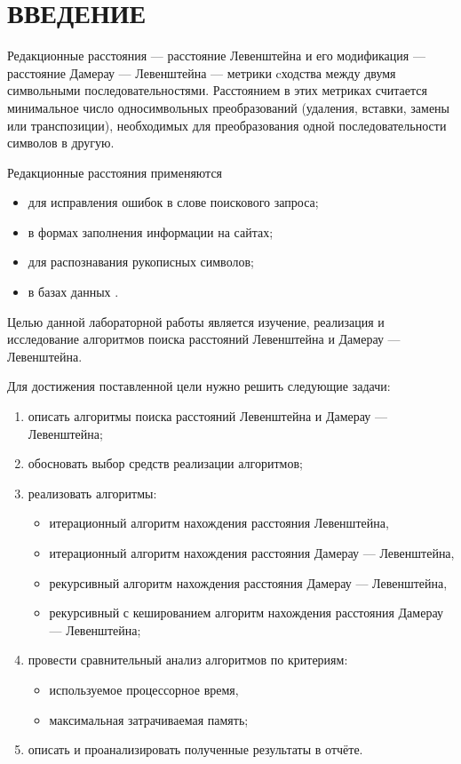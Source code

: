 \section*{ВВЕДЕНИЕ}

Редакционные расстояния --- расстояние Левенштейна и его модификация --- расстояние Дамерау --- Левенштейна --- метрики cходства между двумя символьными последовательностями.
Расстоянием в этих метриках считается минимальное число односимвольных преобразований (удаления, вставки, замены или транспозиции), необходимых для преобразования одной последовательности символов в другую.

Редакционные расстояния применяются 
\begin{itemize}
    \item для исправления ошибок в слове поискового запроса;
    \item в формах заполнения информации на сайтах;
    \item для распознавания рукописных символов;
    \item в базах данных \cite{ldla}.
\end{itemize}

Целью данной лабораторной работы является изучение, реализация и исследование алгоритмов поиска расстояний Левенштейна и Дамерау --- Левенштейна.

Для достижения поставленной цели нужно решить следующие задачи:
\begin{enumerate}
    \item описать алгоритмы поиска расстояний Левенштейна и Дамерау --- Левенштейна;
    \item обосновать выбор средств реализации алгоритмов;
    \item реализовать алгоритмы:
        \begin{itemize}[leftmargin=*]
            \item итерационный алгоритм нахождения расстояния Левенштейна,
            \item итерационный алгоритм нахождения расстояния Дамерау --- Левенштейна,
            \item рекурсивный алгоритм нахождения расстояния Дамерау --- Левенштейна,
            \item рекурсивный с кешированием алгоритм нахождения расстояния Дамерау --- Левенштейна;
        \end{itemize}
    \item провести сравнительный анализ алгоритмов по критериям:
        \begin{itemize}[leftmargin=*]
            \item используемое процессорное время,
            \item максимальная затрачиваемая память;
        \end{itemize}
    \item описать и проанализировать полученные результаты в отчёте.
\end{enumerate} %
